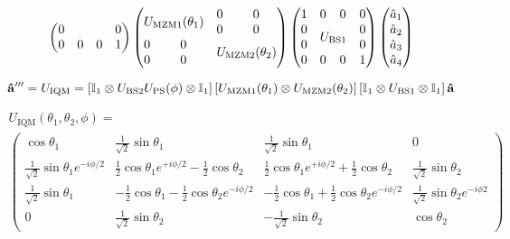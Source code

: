 \begin{equation}
\begin{split}
\begin{pmatrix}
			 0 & & & 0 \\
			 0 & 0 & 0 & 1
		\end{pmatrix}
		\begin{pmatrix}
			 \multicolumn{2}{c}{\multirow{2}{*}{$U_\text{MZM1}(\theta_1)$}} & 0 & 0 \\
			 & & 0 & 0 \\
			 0 & 0 & \multicolumn{2}{c}{\multirow{2}{*}{$U_\text{MZM2}(\theta_2)$}} \\
			 0 & 0 & & \\
		\end{pmatrix}
		\begin{pmatrix}
			 1 & 0 & 0 & 0 \\
			 0 & \multicolumn{2}{c}{\multirow{2}{*}{$U_\text{BS1}$}} & 0 \\
			 0 & & & 0 \\
			 0 & 0 & 0 & 1
		\end{pmatrix}
		\begin{pmatrix}
			\hat{a}_1 \\
			\hat{a}_2 \\
			\hat{a}_3 \\
			\hat{a}_4
		\end{pmatrix}
	\end{split}
\end{equation}

\begin{equation}
	\vb{\hat{a}}^{\prime\prime\prime}
	=
	U_\text{IQM}
	=
	\left[
		\mathbb{I}_1
		\otimes
		U_\text{BS2}
		U_\text{PS}(\phi)
		\otimes
		\mathbb{I}_1
	\right]
	\left[
		U_\text{MZM1}(\theta_1)
		\otimes
		U_\text{MZM2}(\theta_2)
	\right]
	\left[
		\mathbb{I}_1
		\otimes
		U_\text{BS1}
		\otimes
		\mathbb{I}_1
	\right]
	\vb{\hat{a}}
\end{equation}

\begin{equation}
	\begin{split}
		U_\text{IQM}(\theta_1,\theta_2,\phi)
		=
		\\		
		\begin{pmatrix}
			\cos\theta_1 & \frac{1}{\sqrt{2}}\sin\theta_1 & \frac{1}{\sqrt{2}}\sin\theta_1 & 0 \\
			\frac{1}{\sqrt{2}}\sin\theta_1e^{-i\phi/2} & \frac{1}{2}\cos\theta_1e^{+i\phi/2}-\frac{1}{2}\cos\theta_2 & \frac{1}{2}\cos\theta_1e^{+i\phi/2}+\frac{1}{2}\cos\theta_2 & \frac{1}{\sqrt{2}}\sin\theta_2 \\
			\frac{1}{\sqrt{2}}\sin\theta_1 & -\frac{1}{2}\cos\theta_1-\frac{1}{2}\cos\theta_2e^{-i\phi/2} & -\frac{1}{2}\cos\theta_1+\frac{1}{2}\cos\theta_2e^{-i\phi/2} & \frac{1}{\sqrt{2}}\sin\theta_2e^{-i\phi2} \\
			0 & \frac{1}{\sqrt{2}}\sin\theta_2 & -\frac{1}{\sqrt{2}}\sin\theta_2 & \cos\theta_2
		\end{pmatrix}
	\end{split}
\end{equation}

